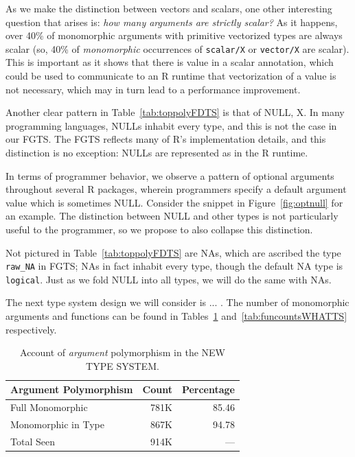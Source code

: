 \documentclass[acmsmall,10pt,review,anonymous]{acmart}\settopmatter{printfolios=true,printccs=false,printacmref=false}
\begin{document}
As we make the distinction between vectors and scalars, one other interesting question that arises is: {\it how many arguments are strictly scalar?}
As it happens, over 40\% of monomorphic arguments with primitive vectorized types are always scalar (so, 40\% of {\it monomorphic} occurrences of {\tt scalar/X} or {\tt vector/X} are scalar).
This is important as it shows that there is value in a scalar annotation, which could be used to communicate to an R runtime that vectorization of a value is not necessary, which may in turn lead to a performance improvement.

Another clear pattern in Table~\ref{tab:toppolyFDTS} is that of NULL, X.
In many programming languages, NULLs inhabit every type, and this is not the case in our FGTS.
The FGTS reflects many of R's implementation details, and this distinction is no exception:
NULLs are represented as  in the R runtime.

In terms of programmer behavior, we observe a pattern of optional arguments throughout several R packages, wherein programmers specify a default argument value which is sometimes NULL.
Consider the snippet in Figure~\ref{fig:optnull} for an example.
The distinction between NULL and other types is not particularly useful to the programmer, so we propose to also collapse this distinction.

Not pictured in Table~\ref{tab:toppolyFDTS} are NAs, which are ascribed the type {\tt raw\_NA} in FGTS; NAs in fact inhabit every type, though the default NA type is {\tt logical}.
Just as we fold NULL into all types, we will do the same with NAs.

The next type system design we will consider is ... .
The number of monomorphic arguments and functions can be found in Tables~\ref{tab:argcountsWHATTS} and~\ref{tab:funcountsWHATTS} respectively.

\begin{table}[ht]
\label{tab:argcountsWHATTS}
\centering
\begin{tabular}{lrr}
  \hline
 Argument Polymorphism & Count & Percentage \\ 
  \hline
  Full Monomorphic & 781K & 85.46 \\
  Monomorphic in Type & 867K & 94.78 \\
  Total Seen & 914K & --- \\ 
     \hline
\end{tabular}
\caption{Account of {\it argument} polymorphism in the NEW TYPE SYSTEM.}
\end{table}
\end{document}
